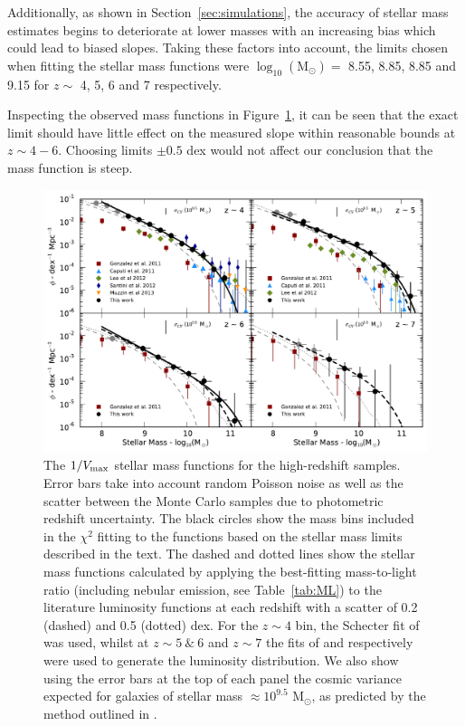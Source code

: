 Additionally, as shown in Section~\ref{sec:simulations}, the accuracy of stellar mass estimates begins to deteriorate at lower masses with an increasing bias which could lead to biased slopes. Taking these factors into account, the limits chosen when fitting the stellar mass functions were $\log_{10} (\text{M}_{\odot}) =$ 8.55, 8.85, 8.85 and 9.15 for $z \sim$ 4, 5, 6 and 7 respectively.

Inspecting the observed mass functions in Figure~\ref{fig:massfunctions}, it can be seen that the exact limit should have little effect on the measured slope within reasonable bounds at $z \sim 4-6$. Choosing limits $\pm 0.5$ dex would not affect our conclusion that the mass function is steep.

\begin{figure}
\centering
\includegraphics[width=\textwidth]{plots/fig9.pdf}
\caption[The $1/V_{\rm{max}}$ stellar mass functions for the high-redshift samples.]{The $1/V_{\rm{max}}$ stellar mass functions for the high-redshift samples. Error bars take into account random Poisson noise as well as the scatter between the Monte Carlo samples due to photometric redshift uncertainty. The black circles show the mass bins included in the $\chi^2$ fitting to the \citet{Schechter:1976gl} functions based on the stellar mass limits described in the text. The dashed and dotted lines show the stellar mass functions calculated by applying the best-fitting mass-to-light ratio (including nebular emission, see Table~\ref{tab:ML}) to the literature luminosity functions at each redshift with a scatter of 0.2 (dashed) and 0.5 (dotted) dex. For the $z\sim4$ bin, the Schecter fit of \citet{2007ApJ...670..928B} was used, whilst at $z\sim5~\&~6$ and $z\sim7$ the fits of \citet{Anonymous:96uKWdy6} and \citet{McLure:2013hh} respectively were used to generate the luminosity distribution. We also show using the error bars at the top of each panel the cosmic variance expected for galaxies of stellar mass $\approx 10^{9.5}$ M$_{\odot}$, as predicted by the method outlined in \citet{Moster:2011ip}.}
\label{fig:massfunctions}
\end{figure}

